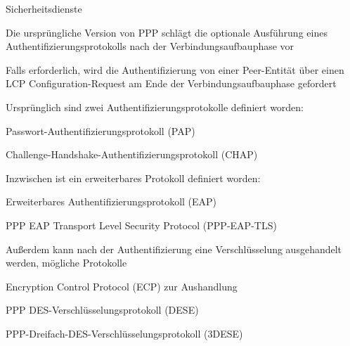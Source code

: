 \documentclass[a4paper]{article}
\begin{document}
\begin{multicols}{3}
      Sicherheitsdienste
      \begin{itemize*}
            \item Die ursprüngliche Version von PPP schlägt die optionale Ausführung eines Authentifizierungsprotokolls nach der Verbindungsaufbauphase vor
            \begin{itemize*}
                  \item Falls erforderlich, wird die Authentifizierung von einer Peer-Entität über einen LCP Configuration-Request am Ende der Verbindungsaufbauphase gefordert
                  \item Ursprünglich sind zwei Authentifizierungsprotokolle definiert worden:
                  \begin{itemize*}
                        \item Passwort-Authentifizierungsprotokoll (PAP)
                        \item Challenge-Handshake-Authentifizierungsprotokoll (CHAP)
                  \end{itemize*}
                  \item Inzwischen ist ein erweiterbares Protokoll definiert worden:
                  \begin{itemize*}
                        \item Erweiterbares Authentifizierungsprotokoll (EAP)
                        \item PPP EAP Transport Level Security Protocol (PPP-EAP-TLS)
                  \end{itemize*}
            \end{itemize*}
            \item Außerdem kann nach der Authentifizierung eine Verschlüsselung ausgehandelt werden, mögliche Protokolle
            \begin{itemize*}
                  \item Encryption Control Protocol (ECP) zur Aushandlung
                  \item PPP DES-Verschlüsselungsprotokoll (DESE)
                  \item PPP-Dreifach-DES-Verschlüsselungsprotokoll (3DESE)
            \end{itemize*}
      \end{itemize*}


\end{multicols}
\end{document}

